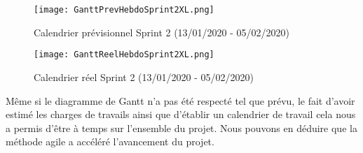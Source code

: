 \begin{figure}[h!]
  \centering
  \texttt{[image: GanttPrevHebdoSprint2XL.png]}
	\caption[]{Calendrier prévisionnel Sprint 2 (13/01/2020 - 05/02/2020)}
	\label{}
\end{figure}

\begin{figure}[h!]
  \centering
  \texttt{[image: GanttReelHebdoSprint2XL.png]}
	\caption[]{Calendrier réel Sprint 2 (13/01/2020 - 05/02/2020)}
	\label{}
\end{figure}

Même si le diagramme de Gantt n'a pas été respecté tel que prévu, le fait d’avoir estimé les charges de travails ainsi que d'établir un calendrier de travail cela nous a permis d'être à temps sur l’ensemble du projet.
Nous pouvons en déduire que la méthode agile a accéléré l'avancement du projet.








